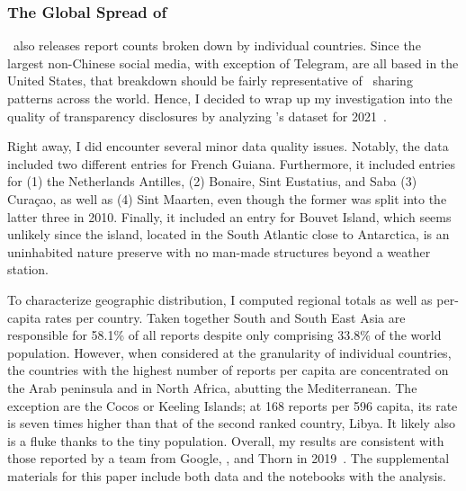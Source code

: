 \subsubsection{The Global Spread of \CSAM}

\NCMEC\ also releases report counts broken down by individual countries. Since
the largest non-Chinese social media, with exception of Telegram, are all based
in the United States, that breakdown should be fairly representative of \CSAM\
sharing patterns across the world. Hence, I decided to wrap up my investigation
into the quality of transparency disclosures by analyzing \NCMEC's dataset for
2021~\cite{NcmecByCountry2021}.

Right away, I did encounter several minor data quality issues. Notably, the data
included two different entries for French Guiana. Furthermore, it included
entries for (1) the Netherlands Antilles, (2) Bonaire, Sint Eustatius, and Saba
(3) Curaçao, as well as (4) Sint Maarten, even though the former was split into
the latter three in 2010. Finally, it included an entry for Bouvet Island, which
seems unlikely since the island, located in the South Atlantic close to
Antarctica, is an uninhabited nature preserve with no man-made structures beyond
a weather station.

To characterize geographic distribution, I computed regional totals as well as
per-capita rates per country. Taken together South and South East Asia are
responsible for 58.1\% of all reports despite only comprising 33.8\% of the
world population. However, when considered at the granularity of individual
countries, the countries with the highest number of reports per capita are
concentrated on the Arab peninsula and in North Africa, abutting the
Mediterranean. The exception are the Cocos or Keeling Islands; at 168 reports
per 596 capita, its rate is seven times higher than that of the second ranked
country, Libya. It likely also is a fluke thanks to the tiny population.
Overall, my results are consistent with those reported by a team from Google,
\NCMEC, and Thorn in 2019~\cite{BurszteinBrightea2019}. The supplemental
materials for this paper include both data and the notebooks with the analysis.

